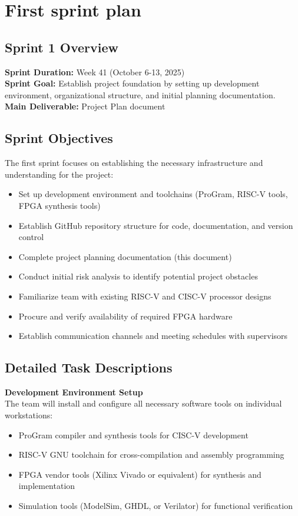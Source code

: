 \documentclass[10pt]{article}
\begin{document}
\section{First sprint plan}

\subsection{Sprint 1 Overview}

\textbf{Sprint Duration:} Week 41 (October 6-13, 2025)\\
\textbf{Sprint Goal:} Establish project foundation by setting up development environment, organizational structure, and initial planning documentation.\\
\textbf{Main Deliverable:} Project Plan document

\subsection{Sprint Objectives}

The first sprint focuses on establishing the necessary infrastructure and understanding for the project:

\begin{itemize}
    \item Set up development environment and toolchains (ProGram, RISC-V tools, FPGA synthesis tools)
    \item Establish GitHub repository structure for code, documentation, and version control
    \item Complete project planning documentation (this document)
    \item Conduct initial risk analysis to identify potential project obstacles
    \item Familiarize team with existing RISC-V and CISC-V processor designs
    \item Procure and verify availability of required FPGA hardware
    \item Establish communication channels and meeting schedules with supervisors
\end{itemize}


\subsection{Detailed Task Descriptions}

\noindent\textbf{Development Environment Setup}\\
The team will install and configure all necessary software tools on individual workstations:
\begin{itemize}
    \item ProGram compiler and synthesis tools for CISC-V development
    \item RISC-V GNU toolchain for cross-compilation and assembly programming
    \item FPGA vendor tools (Xilinx Vivado or equivalent) for synthesis and implementation
    \item Simulation tools (ModelSim, GHDL, or Verilator) for functional verification
\end{itemize}
\end{document}
